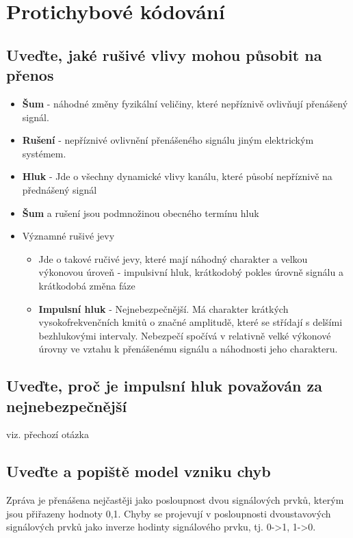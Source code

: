 \clearpage
\section{Protichybové kódování}
\subsection{Uveďte, jaké rušivé vlivy mohou působit na přenos}
\begin{itemize}
    \item \textbf{Šum} - náhodné změny fyzikální veličiny, které nepříznivě ovlivňují přenášený signál.
    \item \textbf{Rušení} - nepříznivé ovlivnění přenášeného signálu jiným elektrickým systémem.
    \item \textbf{Hluk} - Jde o všechny dynamické vlivy kanálu, které působí nepříznivě na přednášený signál
    \item \textbf{Šum} a rušení jsou podmnožinou obecného termínu hluk
    \item Významné rušivé jevy
    \begin{itemize}
        \item Jde o takové ručivé jevy, které mají náhodný charakter a velkou výkonovou  úroveň - impulsivní hluk, krátkodobý pokles úrovně signálu a krátkodobá změna fáze
        \item \textbf{Impulsní hluk} - Nejnebezpečnější.
        Má charakter krátkých vysokofrekvenčních kmitů o značné amplitudě, které se střídají s delšími bezhlukovými intervaly. Nebezpečí spočívá v relativně velké výkonové úrovny ve vztahu k přenášenému signálu a náhodnosti jeho charakteru.
    \end{itemize}
\end{itemize}

\subsection{Uveďte, proč je impulsní hluk považován za nejnebezpečnější}
viz. přechozí otázka

\subsection{Uveďte a popiště model vzniku chyb}
Zpráva je přenášena nejčastěji jako posloupnost dvou signálových prvků, kterým jsou přiřazeny hodnoty 0,1.
Chyby se projevují v posloupnosti dvoustavových signálových prvků jako inverze hodinty signálového prvku, tj. 0->1, 1->0.

